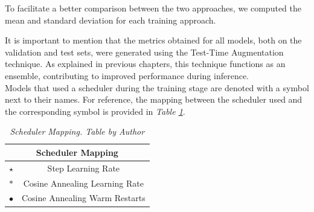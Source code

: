 To facilitate a better comparison between the two approaches, we computed the
mean and standard deviation for each training approach.

\newpage

It is important to mention that the metrics obtained for all models, both on
the validation and test sets, were generated using the Test-Time Augmentation
technique. As explained in previous chapters, this technique functions as an
ensemble, contributing to improved performance during inference. \\

Models that used a scheduler during the training stage are denoted with a
symbol next to their names. For reference, the mapping between the scheduler
used and the corresponding symbol is provided in \textit{Table
\ref{table:scheduler-mapping}}.

\begin{table}[H]
  \centering
  \begin{tabular}{cc}
    \toprule
    \multicolumn{2}{c}{\textbf{Scheduler Mapping}} \\
    \midrule
    $\star$     & Step Learning Rate \\
    $\ast$      & Cosine Annealing Learning Rate \\
    $\bullet$   & Cosine Annealing Warm Restarts \\
    \bottomrule
  \end{tabular}
  \caption[Scheduler Mapping]
  {\textit{Scheduler Mapping.
  Table by Author}}
  \label{table:scheduler-mapping}
\end{table}

\newpage

